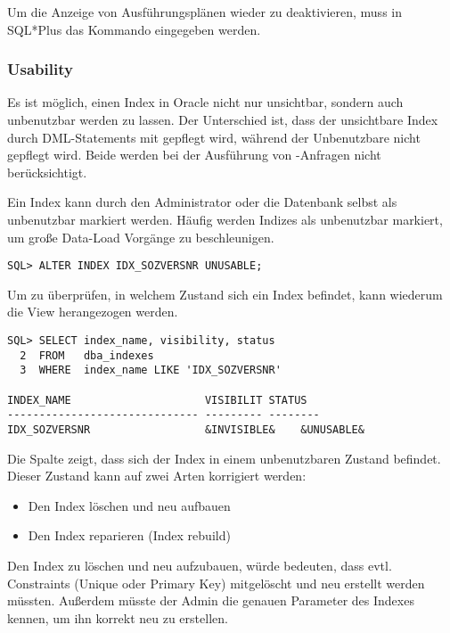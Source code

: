           Um die Anzeige von Ausf\"uhrungspl\"anen wieder zu deaktivieren, muss in SQL*Plus das Kommando  eingegeben werden.
        \subsubsection{Usability}
          Es ist m\"oglich, einen Index in Oracle nicht nur unsichtbar, sondern auch unbenutzbar werden zu lassen. Der Unterschied ist, dass der unsichtbare Index durch DML-Statements mit gepflegt wird, w\"ahrend der Unbenutzbare nicht gepflegt wird. Beide werden bei der Ausf\"uhrung von -Anfragen nicht ber\"ucksichtigt.

          Ein Index kann durch den Administrator oder die Datenbank selbst als unbenutzbar markiert werden. H\"aufig werden Indizes als unbenutzbar markiert, um gro\ss{}e Data-Load Vorg\"ange zu beschleunigen.
          \begin{lstlisting}[caption={Einen Index als unbenutzbar markieren},label=admin329,language=oracle_sql]
SQL> ALTER INDEX IDX_SOZVERSNR UNUSABLE;
          \end{lstlisting}
          Um zu \"uberpr\"ufen, in welchem Zustand sich ein Index befindet, kann wiederum die View  herangezogen werden.
          \begin{lstlisting}[caption={Pr\"ufen, ob ein Index nutzbar ist},label=admin330,language=oracle_sql]
SQL> SELECT index_name, visibility, status
  2  FROM   dba_indexes
  3  WHERE  index_name LIKE 'IDX_SOZVERSNR'

INDEX_NAME                     VISIBILIT STATUS
------------------------------ --------- --------
IDX_SOZVERSNR                  &INVISIBLE&    &UNUSABLE&
          \end{lstlisting}
          Die Spalte  zeigt, dass sich der Index in einem unbenutzbaren Zustand befindet. Dieser Zustand kann auf zwei Arten korrigiert werden:
          \begin{itemize}
            \item Den Index l\"oschen und neu aufbauen
            \item Den Index reparieren (Index rebuild)
          \end{itemize}
          Den Index zu l\"oschen und neu aufzubauen, w\"urde bedeuten, dass evtl. Constraints (Unique oder Primary Key) mitgel\"oscht und neu erstellt werden m\"ussten. Au\ss{}erdem m\"usste der Admin die genauen Parameter des Indexes kennen, um ihn korrekt neu zu erstellen.

